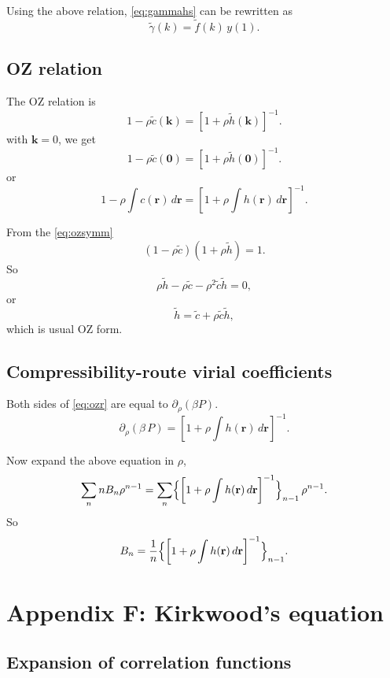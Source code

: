 \documentclass[preprint]{revtex4-1}
\numberwithin{equation}{subsection}
\numberwithin{table}{section}
\newcommand{\vct}[1]{\mathbf{#1}}
\providecommand{\vr}{} %
\renewcommand{\vr}{\vct{r}}
\newcommand{\vk}{\vct{k}}
\begin{document}
Using the above relation, \eqref{eq:gammahs}
can be rewritten as
\[
  \tilde{\gamma}(k) = \tilde{f}(k) \, y(1).
\]




\subsection{OZ relation}

The OZ relation is
\begin{equation}
  1 - \rho \tilde c(\vk)
=
 [1 + \rho \tilde h(\vk)]^{-1}.
 \label{eq:ozsymm}
\end{equation}
%
with $\vk = 0$, we get
\[
  1 - \rho \tilde c(\vct 0)
=
 [1 + \rho \tilde h(\vct 0)]^{-1}.
\]
or
\begin{equation}
  1 - \rho \int c(\vr) \, d\vr
=
 \left[1 + \rho \int h(\vr) \, d\vr \right]^{-1}.
 \label{eq:ozr}
\end{equation}


From the \eqref{eq:ozsymm}
\[
  (1 - \rho \tilde{c}) (1 + \rho \tilde{h}) = 1.
\]
So
\[
  \rho \tilde{h} - \rho \tilde{c} - \rho^2 \tilde{c} \tilde{h} = 0,
\]
or
\[
   \tilde{h} = \tilde{c} + \rho \tilde{c} \tilde{h},
\]
which is usual OZ form.



\subsection{Compressibility-route virial coefficients}



Both sides of \eqref{eq:ozr}
are equal to $\partial_\rho (\beta P)$.
\begin{equation*}
  \partial_\rho (\beta \, P)
=
 \left[1 + \rho \int h(\vr) \, d\vr \right]^{-1}.
\end{equation*}

Now expand the above equation in $\rho$,
\[
  \sum_n n B_n \rho^{n-1}
=
  \sum_n
  \Bigl\{
    \left[1 + \rho \int h(\vr) \, d\vr \right]^{-1}
  \Bigr\}_{n - 1} \, \rho^{n-1}.
\]
So
\[
  B_n
=
\frac{1}{n}
  \Bigl\{
    \left[1 + \rho \int h(\vr) \, d\vr \right]^{-1}
  \Bigr\}_{n - 1}.
\]



\section{Appendix F: Kirkwood's equation}

\subsection{Expansion of correlation functions}
\end{document}
